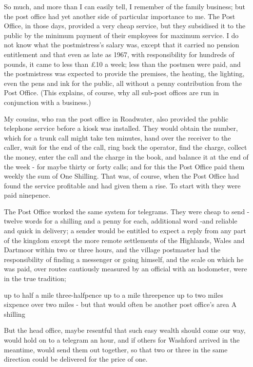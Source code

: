 So much, and more than I can easily tell, I remember of the family business; but the post office had yet another side of particular importance to me. 
The Post Office, in those days, provided a very cheap service, but they subsidised it to the public by the minimum payment of their employees for maximum service. I do not know what the postmistress's salary was, except that it carried no pension entitlement and that even as late as 1967, with responsibility for hundreds of pounds, it came to less than £10 a week; less than the postmen were paid, and the postmistress was expected to provide the premises, the heating, the lighting, even the pens and ink for the public, all without a penny contribution from the Post Office. (This explains, of course, why all sub-post offices are run in conjunction with a business.)

My cousins, who ran the post office in Roadwater, also provided the public telephone service before a kiosk was installed. They would obtain the number, which for a trunk call might take ten minutes, hand over the receiver to the caller, wait for the end of the call, ring back the operator, find the charge, collect the money, enter the call and the charge in the book, and balance it at the end of the week - for maybe thirty or forty calls; and for this the Post Office paid them weekly the sum of One Shilling. That was, of course, when the Post Office had found the service profitable and had given them a rise. To start with they were paid ninepence.

The Post Office worked the same system for telegrams. They were cheap to send - twelve words for a shilling and a penny for each, additional word -and reliable and quick in delivery; a sender would be entitled to expect a reply from any part of the kingdom except the more remote settlements of the Highlands, Wales and Dartmoor within two or three hours, and the village postmaster had the responsibility of finding a messenger or going himself, and the scale on which he was paid, over routes cautiously measured by an official with an hodometer, were in the true tradition;

up to half a mile	three-halfpence
up to a mile	threepence
up to two miles	sixpence
over two miles - but that would often be another post office's area	A shilling

But the head office, maybe resentful that such easy wealth should come our way, would hold on to a telegram an hour, and if others for Washford arrived in the meantime, would send them out together, so that two or three in the same direction could be delivered for the price of one.

